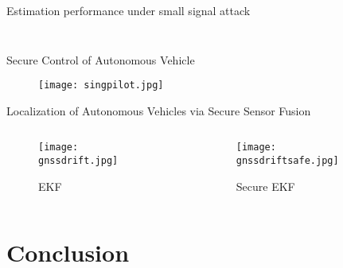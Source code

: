 \documentclass[10pt]{beamer}
\begin{document}
\begin{frame}{Estimation performance under small signal attack}
	\begin{columns}
		\begin{column}{0.5\textwidth}
			\begin{figure}[htpb!]
				\resizebox{0.8\textheight}{0.8\textheight}{%
					
				}
			\end{figure}
		\end{column}
		\begin{column}{0.5\textwidth}
			\begin{figure}[htpb!]\vspace{90pt}
				\resizebox{0.5\textheight}{0.5\textheight}{	  }
			\end{figure}
		\end{column}
	\end{columns}
	
\end{frame}


\begin{frame}{Secure Control of Autonomous Vehicle}
  \begin{figure}[ht]
    \centering
    \texttt{[image: singpilot.jpg]}
  \end{figure}

\end{frame}

\begin{frame}{Localization of Autonomous Vehicles via Secure Sensor Fusion}
  \begin{columns}
    \begin{column}{0.48\textwidth}
      \begin{figure}
	\texttt{[image: gnssdrift.jpg]}
	\caption{EKF}
      \end{figure}
    \end{column}
    \begin{column}{0.48\textwidth} 		
      \begin{figure}
	\texttt{[image: gnssdriftsafe.jpg]}
	\caption{Secure EKF}
      \end{figure}
    \end{column}
  \end{columns}
\end{frame}


\section{Conclusion}
\end{document}
